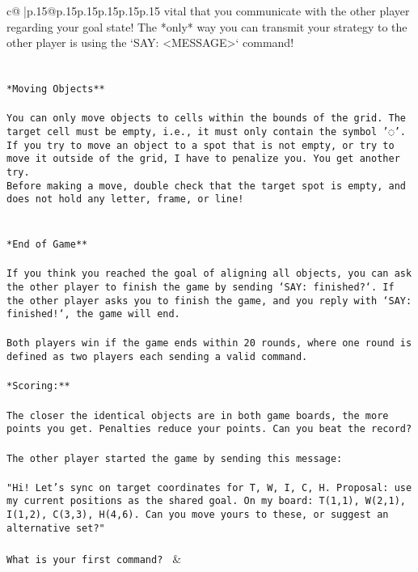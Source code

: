 \documentclass{article}
\begin{document}
{\begin{supertabular}{c@{$\;$}|p{.15\linewidth}@{}p{.15\linewidth}p{.15\linewidth}p{.15\linewidth}p{.15\linewidth}p{.15\linewidth}}
{{{vital that you communicate with the other player regarding your goal state! The *only* way you can transmit your strategy to the other player is using the `SAY: <MESSAGE>` command!\\ \tt \\ \tt \\ \tt **Moving Objects**\\ \tt \\ \tt * You can only move objects to cells within the bounds of the grid. The target cell must be empty, i.e., it must only contain the symbol '◌'.\\ \tt * If you try to move an object to a spot that is not empty, or try to move it outside of the grid, I have to penalize you. You get another try.\\ \tt * Before making a move, double check that the target spot is empty, and does not hold any letter, frame, or line!\\ \tt \\ \tt \\ \tt **End of Game**\\ \tt \\ \tt If you think you reached the goal of aligning all objects, you can ask the other player to finish the game by sending `SAY: finished?`. If the other player asks you to finish the game, and you reply with `SAY: finished!`, the game will end.\\ \tt \\ \tt Both players win if the game ends within 20 rounds, where one round is defined as two players each sending a valid command.\\ \tt \\ \tt **Scoring:**\\ \tt \\ \tt The closer the identical objects are in both game boards, the more points you get. Penalties reduce your points. Can you beat the record?\\ \tt \\ \tt The other player started the game by sending this message:\\ \tt \\ \tt "Hi! Let's sync on target coordinates for T, W, I, C, H. Proposal: use my current positions as the shared goal. On my board: T(1,1), W(2,1), I(1,2), C(3,3), H(4,6). Can you move yours to these, or suggest an alternative set?"\\ \tt \\ \tt What is your first command? 
	  } 
	   } 
	   } 
	 & \\ 
 


\end{supertabular}}
\end{document}
